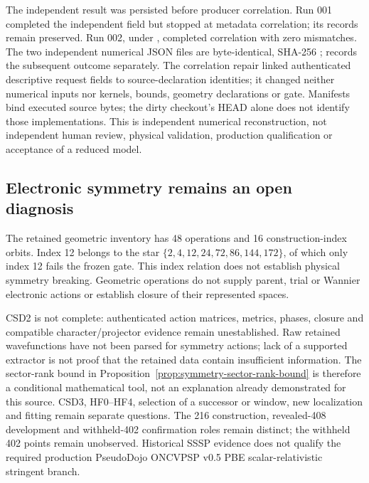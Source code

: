 The independent result was persisted before producer correlation. Run 001
completed the independent field but stopped at metadata correlation; its
records remain preserved. Run 002, under
,
completed correlation with zero mismatches. The two independent numerical
JSON files are byte-identical, SHA-256
;
 records the subsequent outcome separately.
The correlation repair linked authenticated descriptive request fields to
source-declaration identities; it changed neither numerical inputs nor
kernels, bounds, geometry declarations or gate. Manifests bind executed source
bytes; the dirty checkout's HEAD alone does not identify those implementations.
This is independent numerical reconstruction, not independent human review,
physical validation, production qualification or acceptance of a reduced model.

\subsection{Electronic symmetry remains an open diagnosis}

The retained geometric inventory has 48 operations and 16 construction-index
orbits. Index 12 belongs to the star
$\{2,4,12,24,72,86,144,172\}$, of which only index 12 fails the frozen gate.
This index relation does not establish physical symmetry breaking. Geometric
operations do not supply parent, trial or Wannier electronic actions or
establish closure of their represented spaces.

CSD2 is not complete: authenticated action matrices, metrics, phases, closure
and compatible character/projector evidence remain unestablished. Raw retained
wavefunctions have not been parsed for symmetry actions; lack of a supported
extractor is not proof that the retained data contain insufficient information.
The sector-rank bound in
Proposition~\ref{prop:symmetry-sector-rank-bound} is therefore a conditional
mathematical tool, not an explanation already demonstrated for this source.
CSD3, HF0--HF4, selection of a successor or window, new localization and fitting
remain separate questions. The 216 construction, revealed-408 development and
withheld-402 confirmation roles remain distinct; the withheld 402 points remain
unobserved. Historical SSSP evidence does not qualify the required production
PseudoDojo ONCVPSP v0.5 PBE scalar-relativistic stringent branch.

